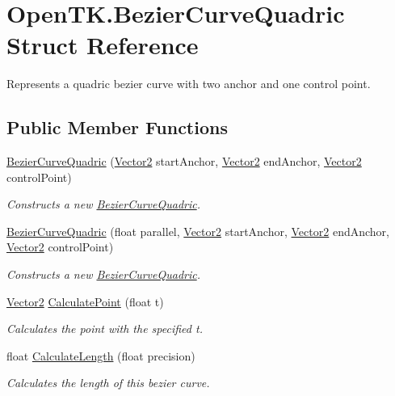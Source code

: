 \hypertarget{struct_open_t_k_1_1_bezier_curve_quadric}{\section{Open\-T\-K.\-Bezier\-Curve\-Quadric Struct Reference}
\label{struct_open_t_k_1_1_bezier_curve_quadric}
}


Represents a quadric bezier curve with two anchor and one control point.  


\subsection*{Public Member Functions}
\begin{DoxyCompactItemize}
\item 
\hyperlink{struct_open_t_k_1_1_bezier_curve_quadric_a51b829efca523f900c2774c63b3b27e9}{Bezier\-Curve\-Quadric} (\hyperlink{struct_open_t_k_1_1_vector2}{Vector2} start\-Anchor, \hyperlink{struct_open_t_k_1_1_vector2}{Vector2} end\-Anchor, \hyperlink{struct_open_t_k_1_1_vector2}{Vector2} control\-Point)
\begin{DoxyCompactList}\small\item\em Constructs a new \hyperlink{struct_open_t_k_1_1_bezier_curve_quadric}{Bezier\-Curve\-Quadric}. \end{DoxyCompactList}\item 
\hyperlink{struct_open_t_k_1_1_bezier_curve_quadric_a43d406a48ec977a62298d41fdf6d7c69}{Bezier\-Curve\-Quadric} (float parallel, \hyperlink{struct_open_t_k_1_1_vector2}{Vector2} start\-Anchor, \hyperlink{struct_open_t_k_1_1_vector2}{Vector2} end\-Anchor, \hyperlink{struct_open_t_k_1_1_vector2}{Vector2} control\-Point)
\begin{DoxyCompactList}\small\item\em Constructs a new \hyperlink{struct_open_t_k_1_1_bezier_curve_quadric}{Bezier\-Curve\-Quadric}. \end{DoxyCompactList}\item 
\hyperlink{struct_open_t_k_1_1_vector2}{Vector2} \hyperlink{struct_open_t_k_1_1_bezier_curve_quadric_a410f985157c2b164fca59516219be22c}{Calculate\-Point} (float t)
\begin{DoxyCompactList}\small\item\em Calculates the point with the specified t. \end{DoxyCompactList}\item 
float \hyperlink{struct_open_t_k_1_1_bezier_curve_quadric_a37d7348ed8738d4804fa99b7dfeb371b}{Calculate\-Length} (float precision)
\begin{DoxyCompactList}\small\item\em Calculates the length of this bezier curve. \end{DoxyCompactList}\end{DoxyCompactItemize}
